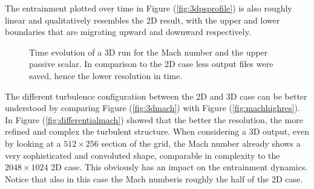 The entrainment plotted over time in Figure (\ref{fig:3dpsprofile}) is also roughly linear and qualitatively resembles the 2D result, with the upper and lower boundaries that are migrating upward and downward respectively.
\begin{figure}[t!]
      \centering
     \centering
	\hfill
	\caption{Time evolution of a 3D run for the Mach number and the upper passive scalar. In comparison to the 2D case less output files were saved, hence the lower resolution in time.}
	\label{fig:3dsingle}
\end{figure}
The different turbulence configuration between the 2D and 3D case can be better understood by comparing Figure (\ref{fig:3dmach}) with Figure (\ref{fig:machhighres}). In Figure (\ref{fig:differentialmach}) showed that the better the resolution, the more refined and complex the turbulent structure. When considering a 3D output, even by looking at a $512 \times 256$ section of the grid, the Mach number already shows a very sophisticated and convoluted shape, comparable in complexity to the $2048 \times 1024$ 2D case. This obviously has an impact on the entrainment dynamics. Notice that also in this case the Mach numberis roughly the half of the 2D case. 

